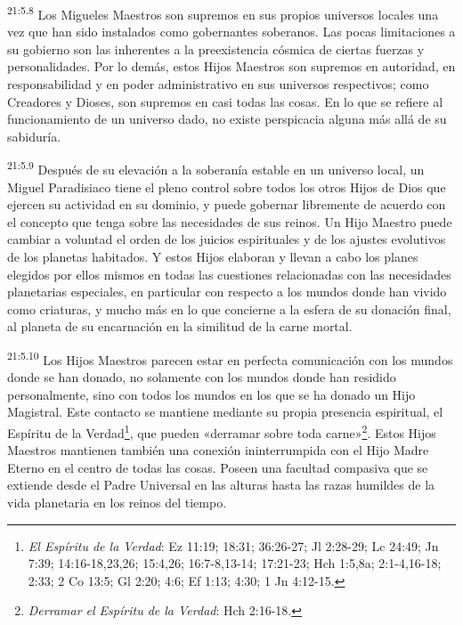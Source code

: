 \par
\textsuperscript{21:5.8} Los Migueles Maestros son supremos en sus propios universos locales una vez que han sido instalados como gobernantes soberanos. Las pocas limitaciones a su gobierno son las inherentes a la preexistencia cósmica de ciertas fuerzas y personalidades. Por lo demás, estos Hijos Maestros son supremos en autoridad, en responsabilidad y en poder administrativo en sus universos respectivos; como Creadores y Dioses, son supremos en casi todas las cosas. En lo que se refiere al funcionamiento de un universo dado, no existe perspicacia alguna más allá de su sabiduría.

\par
\textsuperscript{21:5.9} Después de su elevación a la soberanía estable en un universo local, un Miguel Paradisiaco tiene el pleno control sobre todos los otros Hijos de Dios que ejercen su actividad en su dominio, y puede gobernar libremente de acuerdo con el concepto que tenga sobre las necesidades de sus reinos. Un Hijo Maestro puede cambiar a voluntad el orden de los juicios espirituales y de los ajustes evolutivos de los planetas habitados. Y estos Hijos elaboran y llevan a cabo los planes elegidos por ellos mismos en todas las cuestiones relacionadas con las necesidades planetarias especiales, en particular con respecto a los mundos donde han vivido como criaturas, y mucho más en lo que concierne a la esfera de su donación final, al planeta de su encarnación en la similitud de la carne mortal.

\par
\textsuperscript{21:5.10} Los Hijos Maestros parecen estar en perfecta comunicación con los mundos donde se han donado, no solamente con los mundos donde han residido personalmente, sino con todos los mundos en los que se ha donado un Hijo Magistral. Este contacto se mantiene mediante su propia presencia espiritual, el Espíritu de la Verdad\footnote{\textit{El Espíritu de la Verdad}: Ez 11:19; 18:31; 36:26-27; Jl 2:28-29; Lc 24:49; Jn 7:39; 14:16-18,23,26; 15:4,26; 16:7-8,13-14; 17:21-23; Hch 1:5,8a; 2:1-4,16-18; 2:33; 2 Co 13:5; Gl 2:20; 4:6; Ef 1:13; 4:30; 1 Jn 4:12-15.}, que pueden «derramar sobre toda carne»\footnote{\textit{Derramar el Espíritu de la Verdad}: Hch 2:16-18.}. Estos Hijos Maestros mantienen también una conexión ininterrumpida con el Hijo Madre Eterno en el centro de todas las cosas. Poseen una facultad compasiva que se extiende desde el Padre Universal en las alturas hasta las razas humildes de la vida planetaria en los reinos del tiempo.

